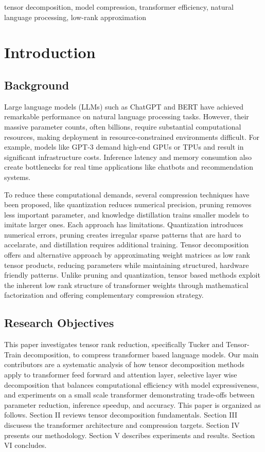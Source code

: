 \documentclass[conference]{IEEEtran}
\begin{document}
\begin{IEEEkeywords}
tensor decomposition, model compression, transformer efficiency, natural language processing, low-rank approximation
\end{IEEEkeywords}


\section{Introduction}

\subsection{Background}
Large language models (LLMs) such as ChatGPT and BERT have achieved remarkable performance on natural language processing tasks.
However, their massive parameter counts, often billions, require substantial computational resources, making deployment in
resource-constrained environments difficult. For example, models like GPT-3 demand high-end GPUs or TPUs and result in significant
infrastructure costs. Inference latency and memory consumtion also create bottlenecks for real time applications like chatbots
and recommendation systems. 

To reduce these computational demands, several compression techniques have been proposed, like quantization reduces numerical
precision, pruning removes less important parameter, and knowledge distillation trains smaller models to imitate larger ones.
Each approach has limitations. Quantization introduces numerical errors, pruning creates irregular sparse patterns that are hard to
accelarate, and distillation requires additional training. Tensor decomposition offers and alternative approach by approximating
weight matrices as low rank tensor products, reducing parameters while maintaining structured, hardware friendly patterns. Unlike
pruning and quantization, tensor based methods exploit the inherent low rank structure of transformer weights through mathematical
factorization and offering complementary compression strategy.

\subsection{Research Objectives}
This paper investigates tensor rank reduction, specifically Tucker and Tensor-Train decomposition, to compress transformer based
language models. Our main contributors are a systematic analysis of how tensor decomposition methods apply to transformer feed 
forward and attention layer, selective layer wise decomposition that balances computational efficiency with model expressiveness,
 and experiments on a small scale transformer demonstrating trade-offs between parameter reduction, inference speedup, and accuracy.
This paper is organized as follows. Section II reviews tensor decomposition fundamentals. Section III discusess the transformer
architecture and compression targets. Section IV presents our methodology. Section V describes experiments and results. Section
VI concludes.
\end{document}
